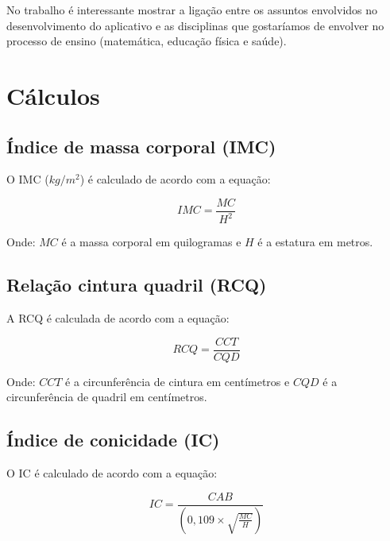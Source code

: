     No trabalho é interessante mostrar a ligação entre os assuntos
    envolvidos no desenvolvimento do aplicativo e as disciplinas que
    gostaríamos de envolver no processo de ensino (matemática, educação
    física e saúde).

    \section{Cálculos}

        \subsection{Índice de massa corporal (IMC)}
        O IMC ($kg/m^2$) é calculado de acordo com a equação:

        \begin{equation}
        \label{eqn:imc}
        IMC=\frac{MC}{H^2}
        \end{equation}

        Onde: $MC$ é a massa corporal em quilogramas e $H$ é a
        estatura em metros.

        \subsection{Relação cintura quadril (RCQ)}
        A RCQ é calculada de acordo com a equação:

        \begin{equation}
        \label{eqn:rcq}
        RCQ=\frac{CCT}{CQD}
        \end{equation}

        Onde: $CCT$ é a circunferência de cintura em centímetros e $CQD$
        é a circunferência de quadril em centímetros.

        \subsection{Índice de conicidade (IC)}
        O IC é calculado de acordo com a equação:

        \begin{equation}
        \label{eqn:ic}
        IC=\frac{CAB}{(0,109\times\sqrt{\frac{MC}{H}})}
        \end{equation}
